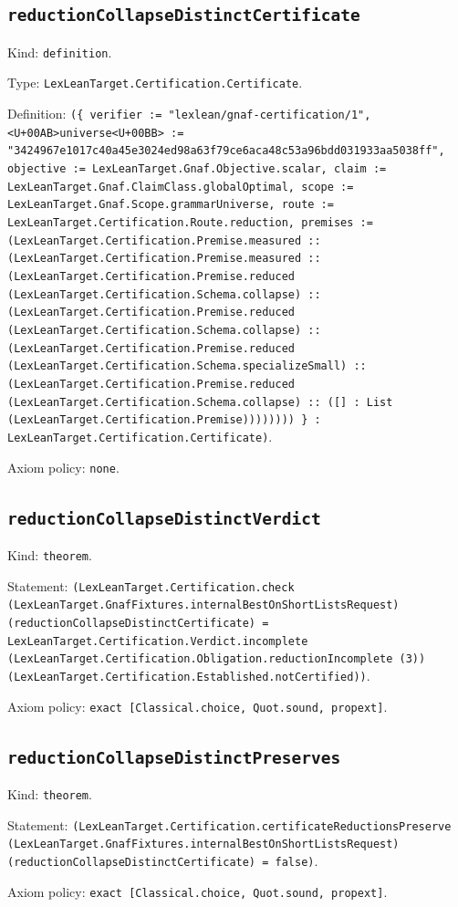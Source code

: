 \documentclass[11pt]{article}
\begin{document}
\subsection*{\texttt{reductionCollapseDistinctCertificate}}
\noindent Kind: \texttt{definition}.\par
\noindent Type: \texttt{LexLeanTarget.Certification.Certificate}.\par
\noindent Definition: \texttt{(\{ verifier := "lexlean/gnaf-certification/1", <U+00AB>universe<U+00BB> := "3424967e1017c40a45e3024ed98a63f79ce6aca48c53a96bdd031933aa5038ff", objective := LexLeanTarget.Gnaf.Objective.scalar, claim := LexLeanTarget.Gnaf.ClaimClass.globalOptimal, scope := LexLeanTarget.Gnaf.Scope.grammarUniverse, route := LexLeanTarget.Certification.Route.reduction, premises := (LexLeanTarget.Certification.Premise.measured :: (LexLeanTarget.Certification.Premise.measured :: (LexLeanTarget.Certification.Premise.reduced (LexLeanTarget.Certification.Schema.collapse) :: (LexLeanTarget.Certification.Premise.reduced (LexLeanTarget.Certification.Schema.collapse) :: (LexLeanTarget.Certification.Premise.reduced (LexLeanTarget.Certification.Schema.specializeSmall) :: (LexLeanTarget.Certification.Premise.reduced (LexLeanTarget.Certification.Schema.collapse) :: ([] : List (LexLeanTarget.Certification.Premise)))))))) \} : LexLeanTarget.Certification.Certificate)}.\par
\noindent Axiom policy: \texttt{none}.\par
\subsection*{\texttt{reductionCollapseDistinctVerdict}}
\noindent Kind: \texttt{theorem}.\par
\noindent Statement: \texttt{(LexLeanTarget.Certification.check (LexLeanTarget.GnafFixtures.internalBestOnShortListsRequest) (reductionCollapseDistinctCertificate) = LexLeanTarget.Certification.Verdict.incomplete (LexLeanTarget.Certification.Obligation.reductionIncomplete (3)) (LexLeanTarget.Certification.Established.notCertified))}.\par
\noindent Axiom policy: \texttt{exact [Classical.choice, Quot.sound, propext]}.\par
\subsection*{\texttt{reductionCollapseDistinctPreserves}}
\noindent Kind: \texttt{theorem}.\par
\noindent Statement: \texttt{(LexLeanTarget.Certification.certificateReductionsPreserve (LexLeanTarget.GnafFixtures.internalBestOnShortListsRequest) (reductionCollapseDistinctCertificate) = false)}.\par
\noindent Axiom policy: \texttt{exact [Classical.choice, Quot.sound, propext]}.\par
\end{document}
